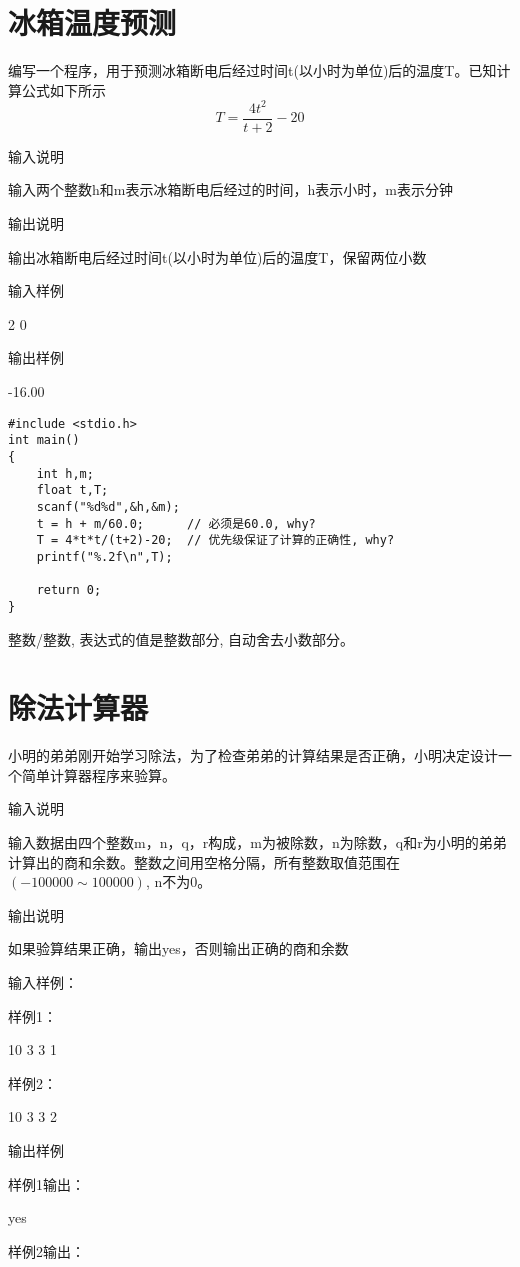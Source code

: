 \section{冰箱温度预测}
编写一个程序，用于预测冰箱断电后经过时间t(以小时为单位)后的温度T。已知计算公式如下所示
\[ T=\frac{4t^2}{t+2}-20 \]

输入说明	

输入两个整数h和m表示冰箱断电后经过的时间，h表示小时，m表示分钟

输出说明
	
输出冰箱断电后经过时间t(以小时为单位)后的温度T，保留两位小数

输入样例
	
2 0

输出样例
	
-16.00

\begin{lstlisting}
#include <stdio.h>
int main()
{
	int h,m;
	float t,T;
	scanf("%d%d",&h,&m);
	t = h + m/60.0;      // 必须是60.0, why?
	T = 4*t*t/(t+2)-20;  // 优先级保证了计算的正确性, why?
	printf("%.2f\n",T);
	
	return 0;
}
\end{lstlisting}

\begin{note}[知识点]
	整数/整数, 表达式的值是整数部分, 自动舍去小数部分。
\end{note}

\section{除法计算器}	
小明的弟弟刚开始学习除法，为了检查弟弟的计算结果是否正确，小明决定设计一个简单计算器程序来验算。

输入说明
	
输入数据由四个整数m，n，q，r构成，m为被除数，n为除数，q和r为小明的弟弟计算出的商和余数。整数之间用空格分隔，所有整数取值范围在$(-100000\sim 100000)$, n不为0。

输出说明
	
如果验算结果正确，输出yes，否则输出正确的商和余数

输入样例：

样例1：

10 3 3 1

样例2：

10 3 3 2

输出样例	

样例1输出：

yes

样例2输出：

